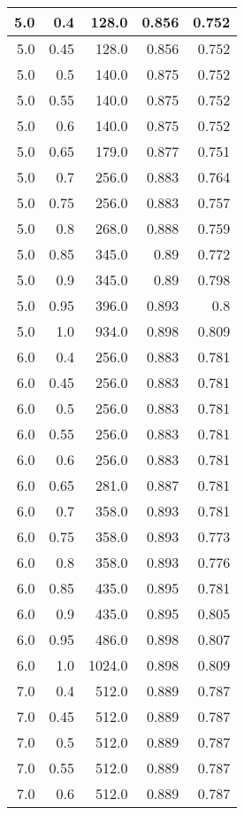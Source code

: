 \begin{center}
\begin{longtable}{|r|r|r|r|r|}
\hline
5.0 & 0.4 & 128.0 & 0.856 & 0.752 \\
\hline
5.0 & 0.45 & 128.0 & 0.856 & 0.752 \\
\hline
5.0 & 0.5 & 140.0 & 0.875 & 0.752 \\
\hline
5.0 & 0.55 & 140.0 & 0.875 & 0.752 \\
\hline
5.0 & 0.6 & 140.0 & 0.875 & 0.752 \\
\hline
5.0 & 0.65 & 179.0 & 0.877 & 0.751 \\
\hline
5.0 & 0.7 & 256.0 & 0.883 & 0.764 \\
\hline
5.0 & 0.75 & 256.0 & 0.883 & 0.757 \\
\hline
5.0 & 0.8 & 268.0 & 0.888 & 0.759 \\
\hline
5.0 & 0.85 & 345.0 & 0.89 & 0.772 \\
\hline
5.0 & 0.9 & 345.0 & 0.89 & 0.798 \\
\hline
5.0 & 0.95 & 396.0 & 0.893 & 0.8 \\
\hline
5.0 & 1.0 & 934.0 & 0.898 & 0.809 \\
\hline
6.0 & 0.4 & 256.0 & 0.883 & 0.781 \\
\hline
6.0 & 0.45 & 256.0 & 0.883 & 0.781 \\
\hline
6.0 & 0.5 & 256.0 & 0.883 & 0.781 \\
\hline
6.0 & 0.55 & 256.0 & 0.883 & 0.781 \\
\hline
6.0 & 0.6 & 256.0 & 0.883 & 0.781 \\
\hline
6.0 & 0.65 & 281.0 & 0.887 & 0.781 \\
\hline
6.0 & 0.7 & 358.0 & 0.893 & 0.781 \\
\hline
6.0 & 0.75 & 358.0 & 0.893 & 0.773 \\
\hline
6.0 & 0.8 & 358.0 & 0.893 & 0.776 \\
\hline
6.0 & 0.85 & 435.0 & 0.895 & 0.781 \\
\hline
6.0 & 0.9 & 435.0 & 0.895 & 0.805 \\
\hline
6.0 & 0.95 & 486.0 & 0.898 & 0.807 \\
\hline
6.0 & 1.0 & 1024.0 & 0.898 & 0.809 \\
\hline
7.0 & 0.4 & 512.0 & 0.889 & 0.787 \\
\hline
7.0 & 0.45 & 512.0 & 0.889 & 0.787 \\
\hline
7.0 & 0.5 & 512.0 & 0.889 & 0.787 \\
\hline
7.0 & 0.55 & 512.0 & 0.889 & 0.787 \\
\hline
7.0 & 0.6 & 512.0 & 0.889 & 0.787 \\

\end{longtable}
\end{center}
